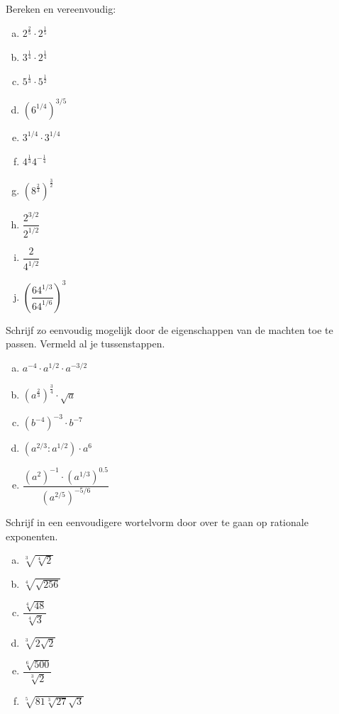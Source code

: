\documentclass[12pt,twoside]{article}
\begin{document}
\begin{oefening}
Bereken en vereenvoudig:
\begin{multicols}{3}
\begin{enumerate}[(a)]
  \itemsep.5em
  \item $2^\frac{2}{5}\cdot2^\frac{1}{5}$
  \item $3^\frac{1}{4}\cdot 2^\frac{1}{4}$
  \item $5^\frac{1}{3}\cdot 5^\frac{1}{2}$
  \item $\left(6^{1/4}\right)^{3/5}$
  \item $3^{1/4}\cdot 3^{1/4}$
  \item $4^\frac{1}{3}4^{-\frac{1}{4}}$
  \item $\left(8^\frac{2}{3}\right)^\frac{3}{2}$
  \item $\dfrac{2^{3/2}}{2^{1/2}}$
  \item $\dfrac{2}{4^{1/2}}$
  \item $\left(\dfrac{64^{1/3}}{64^{1/6}}\right)^3$
\end{enumerate}
\end{multicols}
\end{oefening}

\begin{oefening}
Schrijf zo eenvoudig mogelijk door de eigenschappen van de machten toe te passen. Vermeld al je tussenstappen.
\begin{multicols}{2}
\begin{enumerate}[(a)]
  \itemsep.5em
  \item $a^{-4}\cdot a^{1/2}\cdot a^{-3/2}$
  \item $\left(a^{\frac{2}{3}}\right)^{\frac{3}{4}}\cdot \sqrt{a}$
  \item $\left(b^{-4}\right)^{-3}\cdot b^{-7}$
  \item $\left(a^{2/3}:a^{1/2}\right)\cdot a^6$
  \item $\dfrac{\left(a^2\right)^{-1}\cdot\left(a^{1/3}\right)^{0.5}}{\left(a^{2/5}\right)^{-5/6}}$
\end{enumerate}
\end{multicols}
\end{oefening}

\begin{oefening}
Schrijf in een eenvoudigere wortelvorm door over te gaan op rationale exponenten.
\begin{multicols}{3}
\begin{enumerate}[(a)]
  \itemsep1em
  \item $\sqrt[3]{\sqrt[4]{2}}$
  \item $\sqrt[4]{\sqrt{256}}$
  \item $\dfrac{\sqrt[4]{48}}{\sqrt[4]{3}}$
  \item $\sqrt[3]{2\sqrt{2}}$
  \item $\dfrac{\sqrt[6]{500}}{\sqrt[3]{2}}$
  \item $\sqrt[5]{81\sqrt[3]{27}\sqrt{3}}$
\end{enumerate}
\end{multicols}
\end{oefening}
\end{document}
